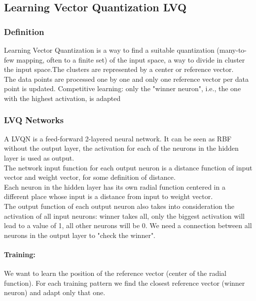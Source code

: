 \subsection{Learning Vector Quantization LVQ}

\subsubsection{Definition}
Learning Vector Quantization is a way to find a suitable quantization (many-to-few mapping, often to a finite set) of the input space, a way to divide in cluster the input space.The clusters are represented by a center or reference vector.\\

The data points are processed one by one and only one reference vector per data point is updated. Competitive learning: only the "winner neuron", i.e., the one with the highest activation, is adapted

\subsubsection{LVQ Networks}
A LVQN is a feed-forward 2-layered neural network. It can be seen as RBF without the output layer, the activation for each of the neurons in the hidden layer is used as output.\\

The network input function for each output neuron is a distance function of input vector and weight vector, for some definition of distance.\\
Each neuron in the hidden layer has its own radial function centered in a different place whose input is a distance from input to weight vector.\\

The output function of each output neuron also takes into consideration the activation of all input neurons: winner takes all, only the biggest activation will lead to a value of 1, all other neurons will be 0. We need a connection between all neurons in the output layer to "check the winner".\\

\paragraph{Training:} We want to learn the position of the reference vector (center of the radial function). For each training pattern we find the closest reference vector (winner neuron) and adapt only that one. \\

